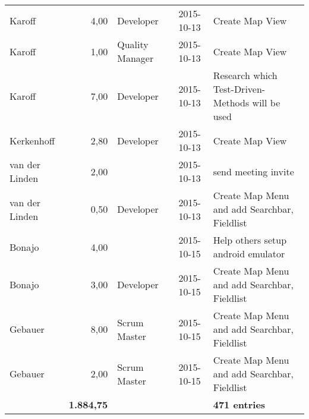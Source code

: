 \begin{longtable}{ l r p{2cm} c p{4cm}}
		\hline
		Karoff                  & 4,00           & Developer       & 2015-10-13    & Create Map View                                 \\
		Karoff                  & 1,00           & Quality Manager & 2015-10-13    & Create Map View                                 \\
		Karoff                  & 7,00           & Developer       & 2015-10-13    & Research which Test-Driven-Methods will be used \\
		Kerkenhoff              & 2,80           & Developer       & 2015-10-13    & Create Map View                                 \\
		van der Linden          & 2,00           &                 & 2015-10-13    & send meeting invite                             \\
		van der Linden          & 0,50           & Developer       & 2015-10-13    & Create Map Menu and add Searchbar, Fieldlist    \\
		Bonajo                  & 4,00           &                 & 2015-10-15    & Help others setup android emulator              \\
		Bonajo                  & 3,00           & Developer       & 2015-10-15    & Create Map Menu and add Searchbar, Fieldlist    \\
		Gebauer                 & 8,00           & Scrum Master    & 2015-10-15    & Create Map Menu and add Searchbar, Fieldlist    \\
		Gebauer                 & 2,00           & Scrum Master    & 2015-10-15    & Create Map Menu and add Searchbar, Fieldlist    \\
		\hline
		 & \textbf{1.884,75} &  &  & \textbf{471 entries}
	\end{longtable}
